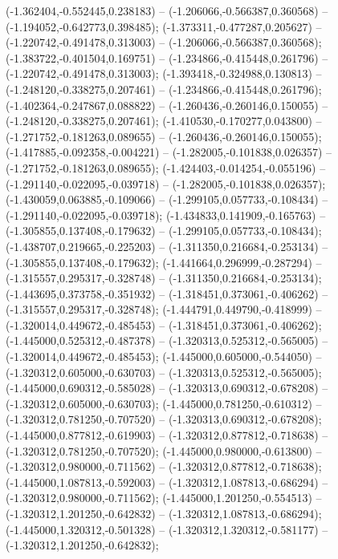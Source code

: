  (-1.362404,-0.552445,0.238183) -- (-1.206066,-0.566387,0.360568) -- (-1.194052,-0.642773,0.398485);
 (-1.373311,-0.477287,0.205627) -- (-1.220742,-0.491478,0.313003) -- (-1.206066,-0.566387,0.360568);
 (-1.383722,-0.401504,0.169751) -- (-1.234866,-0.415448,0.261796) -- (-1.220742,-0.491478,0.313003);
 (-1.393418,-0.324988,0.130813) -- (-1.248120,-0.338275,0.207461) -- (-1.234866,-0.415448,0.261796);
 (-1.402364,-0.247867,0.088822) -- (-1.260436,-0.260146,0.150055) -- (-1.248120,-0.338275,0.207461);
 (-1.410530,-0.170277,0.043800) -- (-1.271752,-0.181263,0.089655) -- (-1.260436,-0.260146,0.150055);
 (-1.417885,-0.092358,-0.004221) -- (-1.282005,-0.101838,0.026357) -- (-1.271752,-0.181263,0.089655);
 (-1.424403,-0.014254,-0.055196) -- (-1.291140,-0.022095,-0.039718) -- (-1.282005,-0.101838,0.026357);
 (-1.430059,0.063885,-0.109066) -- (-1.299105,0.057733,-0.108434) -- (-1.291140,-0.022095,-0.039718);
 (-1.434833,0.141909,-0.165763) -- (-1.305855,0.137408,-0.179632) -- (-1.299105,0.057733,-0.108434);
 (-1.438707,0.219665,-0.225203) -- (-1.311350,0.216684,-0.253134) -- (-1.305855,0.137408,-0.179632);
 (-1.441664,0.296999,-0.287294) -- (-1.315557,0.295317,-0.328748) -- (-1.311350,0.216684,-0.253134);
 (-1.443695,0.373758,-0.351932) -- (-1.318451,0.373061,-0.406262) -- (-1.315557,0.295317,-0.328748);
 (-1.444791,0.449790,-0.418999) -- (-1.320014,0.449672,-0.485453) -- (-1.318451,0.373061,-0.406262);
 (-1.445000,0.525312,-0.487378) -- (-1.320313,0.525312,-0.565005) -- (-1.320014,0.449672,-0.485453);
 (-1.445000,0.605000,-0.544050) -- (-1.320312,0.605000,-0.630703) -- (-1.320313,0.525312,-0.565005);
 (-1.445000,0.690312,-0.585028) -- (-1.320313,0.690312,-0.678208) -- (-1.320312,0.605000,-0.630703);
 (-1.445000,0.781250,-0.610312) -- (-1.320312,0.781250,-0.707520) -- (-1.320313,0.690312,-0.678208);
 (-1.445000,0.877812,-0.619903) -- (-1.320312,0.877812,-0.718638) -- (-1.320312,0.781250,-0.707520);
 (-1.445000,0.980000,-0.613800) -- (-1.320312,0.980000,-0.711562) -- (-1.320312,0.877812,-0.718638);
 (-1.445000,1.087813,-0.592003) -- (-1.320312,1.087813,-0.686294) -- (-1.320312,0.980000,-0.711562);
 (-1.445000,1.201250,-0.554513) -- (-1.320312,1.201250,-0.642832) -- (-1.320312,1.087813,-0.686294);
 (-1.445000,1.320312,-0.501328) -- (-1.320312,1.320312,-0.581177) -- (-1.320312,1.201250,-0.642832);
